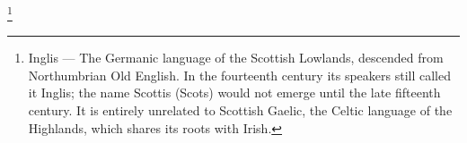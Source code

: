 \footnote{Inglis — The Germanic language of the Scottish Lowlands, descended from Northumbrian Old English. In the fourteenth century its speakers still called it Inglis; the name Scottis (Scots) would not emerge until the late fifteenth century. It is entirely unrelated to Scottish Gaelic, the Celtic language of the Highlands, which shares its roots with Irish.}